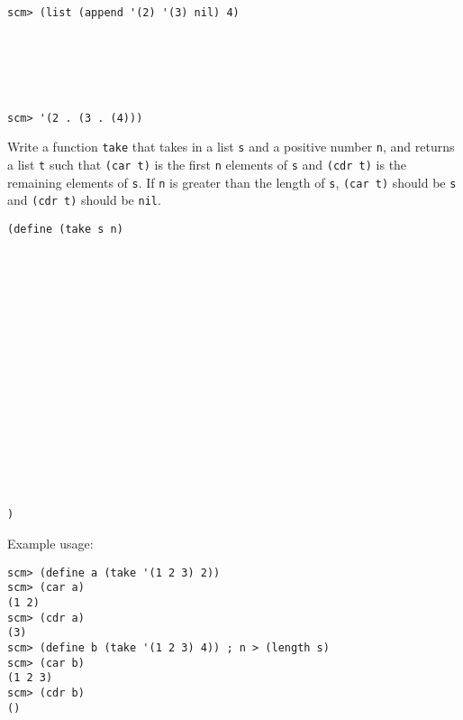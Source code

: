 \documentclass[twoside]{article}
\begin{document}
\begin{enumerate}
\begin{lstlisting}
scm> (list (append '(2) '(3) nil) 4)






scm> '(2 . (3 . (4)))
\end{lstlisting}

\vspace{0.6in}


Write a function \lstinline{take} that takes in a list \lstinline{s} and a positive number \lstinline{n}, and
returns a list \lstinline{t} such that \lstinline{(car t)} is the first \lstinline{n} elements of \lstinline{s} and \lstinline{(cdr t)}
is the remaining elements of \lstinline{s}. If \lstinline{n} is greater than the length of \lstinline{s}, \lstinline{(car t)} should be \lstinline{s} and \lstinline{(cdr t)} should be \lstinline{nil}.

\begin{lstlisting}
(define (take s n)


















)
\end{lstlisting}

Example usage:

\begin{lstlisting}
scm> (define a (take '(1 2 3) 2))
scm> (car a)
(1 2)
scm> (cdr a)
(3)
scm> (define b (take '(1 2 3) 4)) ; n > (length s)
scm> (car b)
(1 2 3)
scm> (cdr b)
()
\end{lstlisting}

\end{enumerate}
\end{document}
